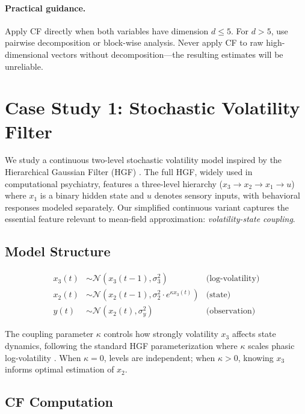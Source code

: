 \documentclass[10pt]{article} %
\theoremstyle{plain}
\theoremstyle{definition}
\begin{document}
\paragraph{Practical guidance.} Apply CF directly when both variables have dimension $d \leq 5$. For $d > 5$, use pairwise decomposition or block-wise analysis. Never apply CF to raw high-dimensional vectors without decomposition---the resulting estimates will be unreliable.

\section{Case Study 1: Stochastic Volatility Filter}
\label{sec:hgf}

We study a continuous two-level stochastic volatility model inspired by the Hierarchical Gaussian Filter (HGF) \citep{mathys2011bayesian}. The full HGF, widely used in computational psychiatry, features a three-level hierarchy ($x_3 \to x_2 \to x_1 \to u$) where $x_1$ is a binary hidden state and $u$ denotes sensory inputs, with behavioral responses modeled separately. Our simplified continuous variant captures the essential feature relevant to mean-field approximation: \emph{volatility-state coupling}.

\subsection{Model Structure}

\begin{align}
x_3(t) &\sim \mathcal{N}(x_3(t-1), \sigma_3^2) & \text{(log-volatility)} \\
x_2(t) &\sim \mathcal{N}(x_2(t-1), \sigma_2^2 \cdot e^{\kappa x_3(t)}) & \text{(state)} \\
y(t) &\sim \mathcal{N}(x_2(t), \sigma_y^2) & \text{(observation)}
\end{align}

The coupling parameter $\kappa$ controls how strongly volatility $x_3$ affects state dynamics, following the standard HGF parameterization where $\kappa$ scales phasic log-volatility \citep{mathys2011bayesian}. When $\kappa = 0$, levels are independent; when $\kappa > 0$, knowing $x_3$ informs optimal estimation of $x_2$.

\subsection{CF Computation}
\end{document}
